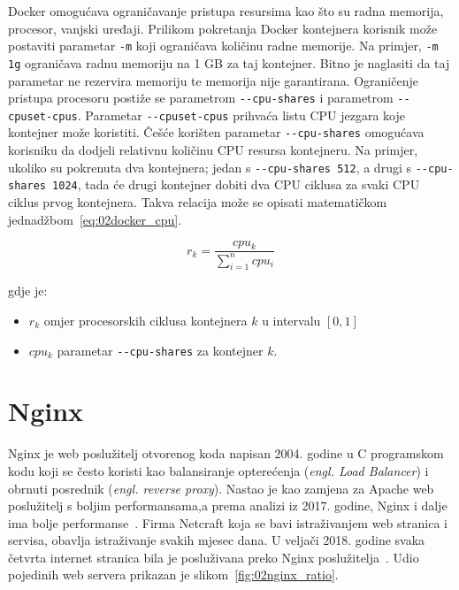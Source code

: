 Docker omogućava ograničavanje pristupa resursima kao što su radna memorija, procesor, vanjski
uređaji. Prilikom pokretanja Docker kontejnera korisnik može postaviti parametar \texttt{-m} koji
ograničava količinu radne memorije. Na primjer, \texttt{-m 1g} ograničava radnu memoriju na 1 GB za
taj kontejner. Bitno je naglasiti da taj parametar ne rezervira memoriju te memorija nije
garantirana.  Ograničenje pristupa procesoru postiže se parametrom \texttt{-{}-cpu-shares} i
parametrom \texttt{-{}-cpuset-cpus}.  Parametar \texttt{-{}-cpuset-cpus} prihvaća listu CPU jezgara
koje kontejner može koristiti. Češće korišten parametar \texttt{-{}-cpu-shares} omogućava korisniku
da dodjeli relativnu količinu CPU resursa kontejneru.  Na primjer, ukoliko su pokrenuta dva
kontejnera; jedan s \texttt{-{}-cpu-shares 512}, a drugi s \texttt{-{}-cpu-shares 1024}, tada će
drugi kontejner dobiti dva CPU ciklusa za svaki CPU ciklus prvog kontejnera. Takva relacija može se
opisati matematičkom jednadžbom~\ref{eq:02docker_cpu}.

\begin{equation}
   r_k = \frac{cpu_k} {\sum_{i=1}^{n} cpu_i}
   \label{eq:02docker_cpu}
\end{equation}

gdje je:

\begin{itemize}
    \item $r_k$ omjer procesorskih ciklusa kontejnera $k$ u intervalu $[0, 1]$
    \item $cpu_k$ parametar \texttt{-{}-cpu-shares} za kontejner $k$.
\end{itemize}

\section{Nginx}
Nginx je web poslužitelj otvorenog koda napisan 2004. godine u C programskom kodu koji se često
koristi kao balansiranje opterećenja (\textit{engl. Load Balancer}) i obrnuti posrednik
(\textit{engl. reverse proxy}). Nastao je kao zamjena za Apache web poslužitelj s boljim
performansama,a prema analizi iz 2017. godine, Nginx i dalje ima bolje
performanse~\citep{nguyen2017comparative}. Firma Netcraft koja se bavi istraživanjem web stranica
i servisa, obavlja istraživanje svakih mjesec dana. U veljači 2018. godine svaka četvrta internet
stranica bila je posluživana preko Nginx poslužitelja~\citep{Netcraft2018}. Udio pojedinih web
servera prikazan je slikom~\ref{fig:02nginx_ratio}.

